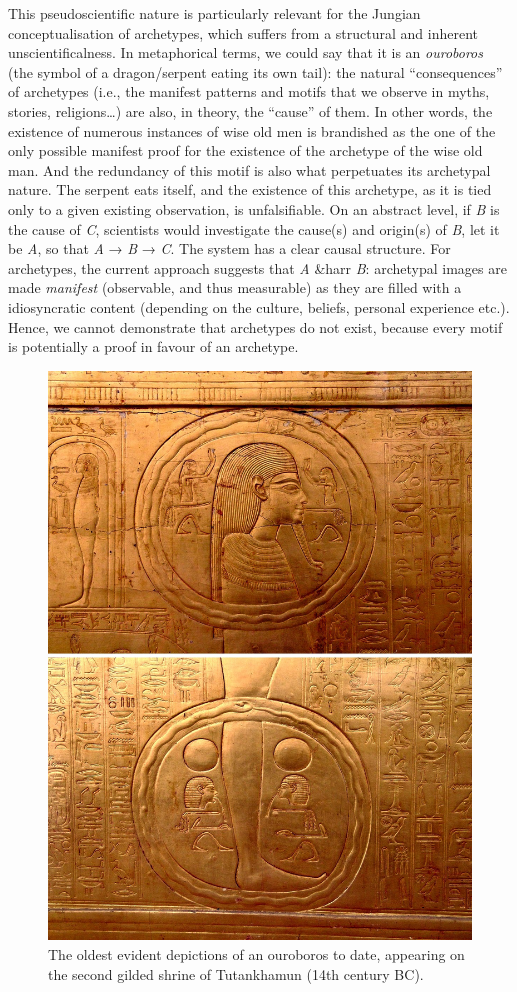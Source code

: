 \documentclass[
]{book}
\begin{document}
This pseudoscientific nature is particularly relevant for the Jungian conceptualisation of archetypes, which suffers from a structural and inherent unscientificalness. In metaphorical terms, we could say that it is an \emph{ouroboros} (the symbol of a dragon/serpent eating its own tail): the natural ``consequences'' of archetypes (i.e., the manifest patterns and motifs that we observe in myths, stories, religions\ldots) are also, in theory, the ``cause'' of them. In other words, the existence of numerous instances of wise old men is brandished as the one of the only possible manifest proof for the existence of the archetype of the wise old man. And the redundancy of this motif is also what perpetuates its archetypal nature. The serpent eats itself, and the existence of this archetype, as it is tied only to a given existing observation, is unfalsifiable. On an abstract level, if \emph{B} is the cause of \emph{C}, scientists would investigate the cause(s) and origin(s) of \emph{B}, let it be \emph{A}, so that \emph{A} → \emph{B} → \emph{C}. The system has a clear causal structure. For archetypes, the current approach suggests that \emph{A} \&harr \emph{B}: archetypal images are made \emph{manifest} (observable, and thus measurable) as they are filled with a idiosyncratic content (depending on the culture, beliefs, personal experience etc.). Hence, we cannot demonstrate that archetypes do not exist, because every motif is potentially a proof in favour of an archetype.

\begin{figure}

{\centering \includegraphics[width=0.49\linewidth]{img/ouroboros_tutankhumon} 

}

\caption{The oldest evident depictions of an ouroboros to date, appearing on the second gilded shrine of Tutankhamun (14th century BC).}\label{fig:unnamed-chunk-12}
\end{figure}
\end{document}
